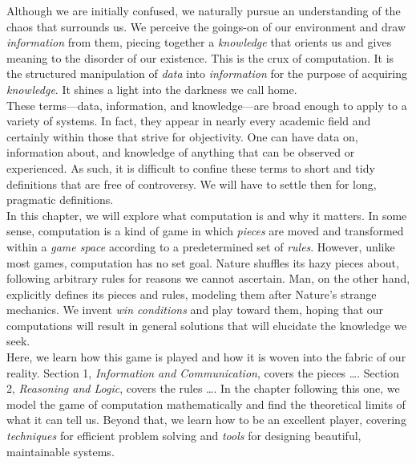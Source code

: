 Although we are initially confused, we naturally pursue an understanding of the chaos that surrounds us. We perceive the goings-on of our environment and draw \textit{information} from them, piecing together a \textit{knowledge} that orients us and gives meaning to the disorder of our existence. This is the crux of computation. It is the structured manipulation of \textit{data} into \textit{information} for the purpose of acquiring \textit{knowledge}. It shines a light into the darkness we call home. \\

These terms---data, information, and knowledge---are broad enough to apply to a variety of systems. In fact, they appear in nearly every academic field and certainly within those that strive for objectivity. One can have data on, information about, and knowledge of anything that can be observed or experienced. As such, it is difficult to confine these terms to short and tidy definitions that are free of controversy. We will have to settle then for long, pragmatic definitions. \\

In this chapter, we will explore what computation is and why it matters. In some sense, computation is a kind of game in which \textit{pieces} are moved and transformed within a \textit{game space} according to a predetermined set of \textit{rules}. However, unlike most games, computation has no set goal. Nature shuffles its hazy pieces about, following arbitrary rules for reasons we cannot ascertain. Man, on the other hand, explicitly defines its pieces and rules, modeling them after Nature's strange mechanics. We invent \textit{win conditions} and play toward them, hoping that our computations will result in general solutions that will elucidate the knowledge we seek. \\

Here, we learn how this game is played and how it is woven into the fabric of our reality. Section 1, \textit{Information and Communication}, covers the pieces \dots. Section 2, \textit{Reasoning and Logic}, covers the rules \dots. In the chapter following this one, we model the game of computation mathematically and find the theoretical limits of what it can tell us. Beyond that, we learn how to be an excellent player, covering \textit{techniques} for efficient problem solving and \textit{tools} for designing beautiful, maintainable systems. \\


